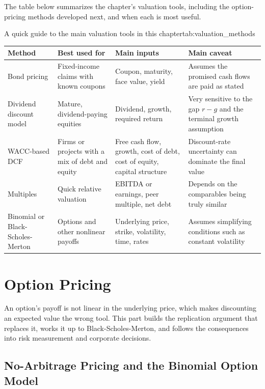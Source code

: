 \documentclass[../ai_in_finance]{subfiles}
\begin{document}
The table below summarizes the chapter's valuation tools, including the option-pricing methods developed next, and when each is most useful.

\begin{booktable}[htbp]{A quick guide to the main valuation tools in this chapter}{tab:valuation_methods}
\begin{tabular}{L{2.6cm}L{3.4cm}L{3.4cm}L{3.4cm}}
\toprule
Method & Best used for & Main inputs & Main caveat \\
\midrule
Bond pricing & Fixed-income claims with known coupons & Coupon, maturity, face value, yield & Assumes the promised cash flows are paid as stated \\
Dividend discount model & Mature, dividend-paying equities & Dividend, growth, required return & Very sensitive to the gap $r-g$ and the terminal growth assumption \\
WACC-based DCF & Firms or projects with a mix of debt and equity & Free cash flow, growth, cost of debt, cost of equity, capital structure & Discount-rate uncertainty can dominate the final value \\
Multiples & Quick relative valuation & EBITDA or earnings, peer multiple, net debt & Depends on the comparables being truly similar \\
Binomial or Black-Scholes-Merton & Options and other nonlinear payoffs & Underlying price, strike, volatility, time, rates & Assumes simplifying conditions such as constant volatility \\
\bottomrule
\end{tabular}
\end{booktable}

\section{Option Pricing}

An option's payoff is not linear in the underlying price, which makes discounting an expected value the wrong tool. This part builds the replication argument that replaces it, works it up to Black-Scholes-Merton, and follows the consequences into risk measurement and corporate decisions.

\subsection{No-Arbitrage Pricing and the Binomial Option Model}
\label{sec:valuation-binomial}
\end{document}
